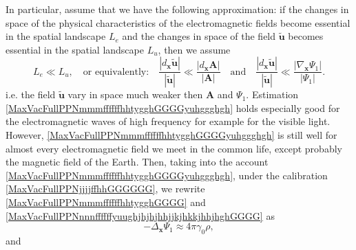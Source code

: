 \documentclass{article}
\theoremstyle{definition}
\theoremstyle{remark}
\renewcommand{\vec}[1]{\mathbf{#1}}
\newcommand{\er}{\eqref}
\newcommand{\er}{\eqref}
\begin{document}
In particular, assume that we have the following approximation: if
the changes in space of the physical characteristics of the
electromagnetic fields become essential in the spatial landscape
$L_e$ and the changes in space of the field $\vec {\tilde u}$
becomes essential in the spatial landscape $L_{u}$, then we assume
\begin{equation}\label{MaxVacFullPPNmmmffffffhhtygghGGGGyuhggghgh}
L_e\ll L_u,\quad\text{or equivalently:}\quad \frac{|d_{\vec x}\vec
{\tilde u}|}{|\vec {\tilde u}|}\ll\frac{|d_{\vec x}\vec A|}{|\vec
A|}\quad\text{and}\quad\frac{|d_{\vec x}\vec {\tilde u}|}{|\vec
{\tilde u}|}\ll\frac{|\nabla_{\vec x}\Psi_1|}{|\Psi_1|}.
\end{equation}
i.e. the field $\vec {\tilde u}$ vary in space much weaker then
$\vec A$ and $\Psi_1$. Estimation
\er{MaxVacFullPPNmmmffffffhhtygghGGGGyuhggghgh} holds especially
good for the electromagnetic waves of high frequency for example for
the visible light. However,
\er{MaxVacFullPPNmmmffffffhhtygghGGGGyuhggghgh} is still well for
almost every electromagnetic field we meet in the common life,
except probably the magnetic field of the Earth. Then, taking into
the account \er{MaxVacFullPPNmmmffffffhhtygghGGGGyuhggghgh}, under
the calibration \er{MaxVacFullPPNjjjjffhhGGGGGG}, we rewrite
\er{MaxVacFullPPNmmmffffffhhtygghGGGG} and
\er{MaxVacFullPPNnnnffffffyuughjhjhjhhjjkjhkkjhhjhghGGGG} as
\begin{equation}\label{MaxVacFullPPNmmmffffffhhtygghGGGGgg}
-\Delta_{\vec x}\Psi_1\approx 4\pi\gamma_0\rho,
\end{equation}
and
\end{document}
